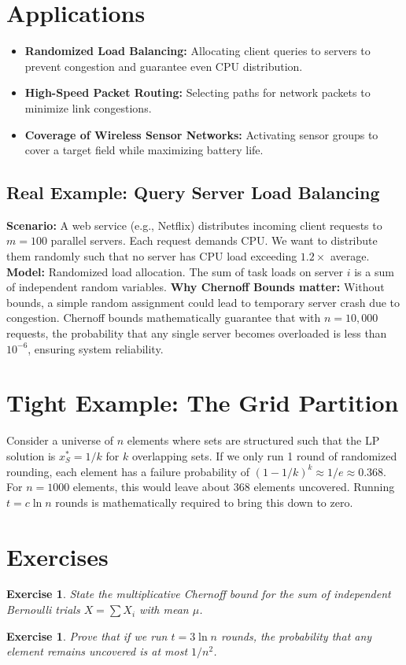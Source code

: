 \documentclass[11pt,oneside]{book}
\newtheorem{exercise}[theorem]{Exercise}
\begin{document}
\section{Applications}
\begin{itemize}
    \item \textbf{Randomized Load Balancing:} Allocating client queries to servers to prevent congestion and guarantee even CPU distribution.
    \item \textbf{High-Speed Packet Routing:} Selecting paths for network packets to minimize link congestions.
    \item \textbf{Coverage of Wireless Sensor Networks:} Activating sensor groups to cover a target field while maximizing battery life.
\end{itemize}

\subsection*{Real Example: Query Server Load Balancing}
\textbf{Scenario:} A web service (e.g., Netflix) distributes incoming client requests to $m = 100$ parallel servers. Each request demands CPU. We want to distribute them randomly such that no server has CPU load exceeding $1.2 \times$ average.
\textbf{Model:} Randomized load allocation. The sum of task loads on server $i$ is a sum of independent random variables.
\textbf{Why Chernoff Bounds matter:} Without bounds, a simple random assignment could lead to temporary server crash due to congestion. Chernoff bounds mathematically guarantee that with $n = 10,000$ requests, the probability that any single server becomes overloaded is less than $10^{-6}$, ensuring system reliability.

\section{Tight Example: The Grid Partition}
Consider a universe of $n$ elements where sets are structured such that the LP solution is $x_S^* = 1/k$ for $k$ overlapping sets. If we only run 1 round of randomized rounding, each element has a failure probability of $(1-1/k)^k \approx 1/e \approx 0.368$. For $n = 1000$ elements, this would leave about 368 elements uncovered. Running $t = c \ln n$ rounds is mathematically required to bring this down to zero.

\section{Exercises}
\begin{exercise}
State the multiplicative Chernoff bound for the sum of independent Bernoulli trials $X = \sum X_i$ with mean $\mu$.
\end{exercise}
\begin{exercise}
Prove that if we run $t = 3 \ln n$ rounds, the probability that any element remains uncovered is at most $1/n^2$.
\end{exercise}
\end{document}
